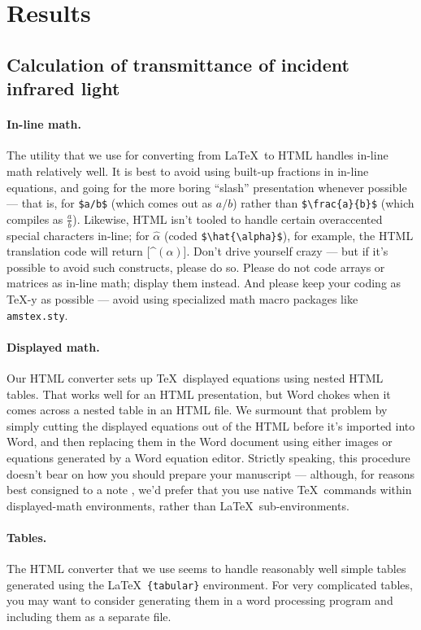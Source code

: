 \documentclass[12pt]{article}
\begin{document}
\section*{Results}

\subsection*{Calculation of transmittance of incident infrared light}

\paragraph*{In-line math.}  The utility that we use for converting
from \LaTeX\ to HTML handles in-line math relatively well.  It is best
to avoid using built-up fractions in in-line equations, and going for
the more boring ``slash'' presentation whenever possible --- that is,
for \verb+$a/b$+ (which comes out as $a/b$) rather than
\verb+$\frac{a}{b}$+ (which compiles as $\frac{a}{b}$).  Likewise,
HTML isn't tooled to handle certain overaccented special characters
in-line; for $\hat{\alpha}$ (coded \verb+$\hat{\alpha}$+), for
example, the HTML translation code will return [\^{}$(\alpha)$].
Don't drive yourself crazy --- but if it's possible to avoid such
constructs, please do so.  Please do not code arrays or matrices as
in-line math; display them instead.  And please keep your coding as
\TeX-y as possible --- avoid using specialized math macro packages
like \texttt{amstex.sty}.

\paragraph*{Displayed math.} Our HTML converter sets up \TeX\
displayed equations using nested HTML tables.  That works well for an
HTML presentation, but Word chokes when it comes across a nested
table in an HTML file.  We surmount that problem by simply cutting the
displayed equations out of the HTML before it's imported into Word,
and then replacing them in the Word document using either images or
equations generated by a Word equation editor.  Strictly speaking,
this procedure doesn't bear on how you should prepare your manuscript
--- although, for reasons best consigned to a note \cite{nattex}, we'd
prefer that you use native \TeX\ commands within displayed-math
environments, rather than \LaTeX\ sub-environments.

\paragraph*{Tables.}  The HTML converter that we use seems to handle
reasonably well simple tables generated using the \LaTeX\
\texttt{\{tabular\}} environment.  For very complicated tables, you
may want to consider generating them in a word processing program and
including them as a separate file.
\end{document}
